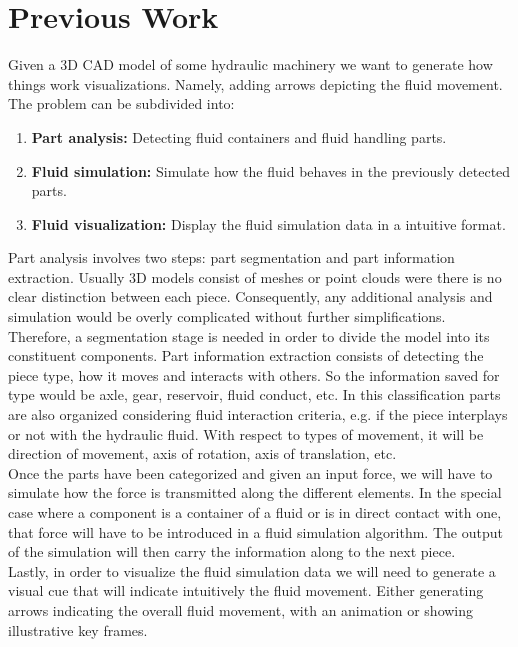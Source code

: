 \chapter{Previous Work}
\label{sec:prevWork}

Given a 3D CAD model of some hydraulic machinery we want to generate how things work visualizations.
Namely, adding arrows depicting the fluid movement.\\

The problem can be subdivided into:
\begin{enumerate}
\item \textbf{Part analysis:} Detecting fluid containers and fluid handling parts.
\item \textbf{Fluid simulation:} Simulate how the fluid behaves in the previously detected parts.
\item \textbf{Fluid visualization:} Display the fluid simulation data in a intuitive format.\\
\end{enumerate}

Part analysis involves two steps: part segmentation and part information extraction.
Usually 3D models consist of meshes or point clouds were there is no clear distinction between each piece.
Consequently, any additional analysis and simulation would be overly complicated without further simplifications.  
Therefore, a segmentation stage is needed in order to divide the model into its constituent components.
Part information extraction consists of detecting the piece type, how it moves and interacts with others.
So the information saved for type would be axle, gear, reservoir, fluid conduct, etc.
In this classification parts are also organized considering fluid interaction criteria, e.g. if the piece interplays or not with the hydraulic fluid.
With respect to types of movement, it will be direction of movement, axis of rotation, axis of translation, etc.\\

Once the parts have been categorized and given an input force, we will have to simulate how the force is transmitted along the different elements.
In the special case where a component is a container of a fluid or is in direct contact with one, that force will have to be introduced in a fluid simulation algorithm.
The output of the simulation will then carry the information along to the next piece.\\

Lastly, in order to visualize the fluid simulation data we will need to generate a visual cue that will indicate intuitively the fluid movement.
Either generating arrows indicating the overall fluid movement, with an animation or showing illustrative key frames.

